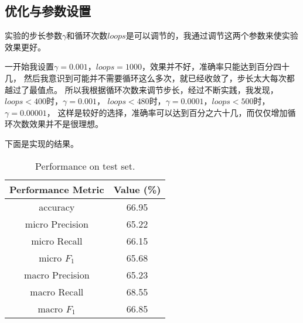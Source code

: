 \documentclass{article}
\begin{document}
\subsection{优化与参数设置}
实验的步长参数$\gamma$和循环次数$loops$是可以调节的，我通过调节这两个参数来使实验效果更好。

一开始我设置$\gamma = 0.001， loops = 1000$，效果并不好，准确率只能达到百分四十几，
然后我意识到可能并不需要循环这么多次，就已经收敛了，步长太大每次都越过了最值点。
所以我根据循环次数来调节步长，经过不断实践，我发现，$loops < 400$时，$\gamma = 0.001$，
$loops < 480$时，$\gamma = 0.0001$，$loops < 500$时，$\gamma = 0.00001$，
这样是较好的选择，准确率可以达到百分之六十几，而仅仅增加循环次数效果并不是很理想。

下面是实现的结果。

\begin{table}[h]
    \centering
     \caption{Performance on test set.}
     \vspace{2mm}
    \label{tab:my_label}
    \begin{tabular}{|c|c|}
       \hline
       Performance Metric & Value (\%) \\
       \hline
       accuracy & 66.95 \\
       \hline
       micro Precision  & 65.22\\
       \hline
       micro Recall & 66.15\\
       \hline
       micro $F_1$ & 65.68\\
       \hline
       macro Precision  & 65.23\\
       \hline
       macro Recall & 68.55\\
       \hline
       macro $F_1$ & 66.85\\
       \hline
    \end{tabular}

\end{table}
\end{document}
